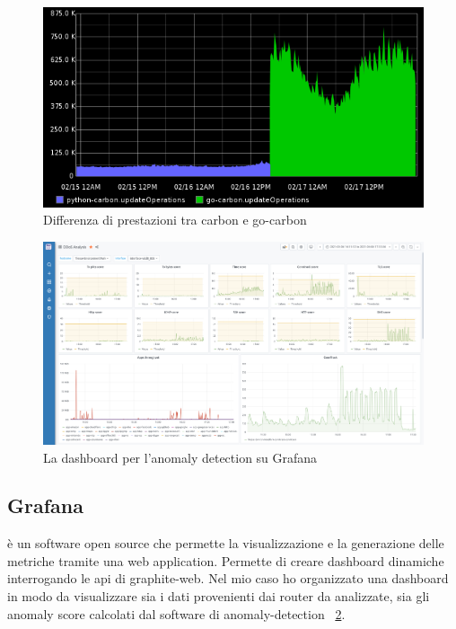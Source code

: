 \begin{figure}[h]
    \label{fig:gocarbon}
    \includegraphics[width=\hsize]{images/my_work/go-carbon.png}
    \caption{Differenza di prestazioni tra carbon e go-carbon}
    \centering
\end{figure}


\begin{figure}[h]
    \label{fig:grafana}
    \includegraphics[width=\hsize]{images/my_work/grafana_dashboard.png}
    \caption{La dashboard per l'anomaly detection su Grafana}
    \centering
\end{figure}

\subsection{Grafana} è un software open source che permette la visualizzazione e la generazione delle metriche tramite una web application. Permette di creare dashboard dinamiche interrogando le api di graphite-web. Nel mio caso ho organizzato una dashboard in modo da visualizzare sia i dati provenienti dai router da analizzate, sia gli anomaly score calcolati dal software di anomaly-detection ~\ref{fig:grafana}.


